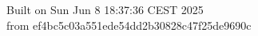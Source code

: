 {\noindent Built on Sun Jun  8 18:37:36 CEST 2025} \\ 
 {\noindent from ef4bc5c03a551ede54dd2b30828c47f25de9690c}
